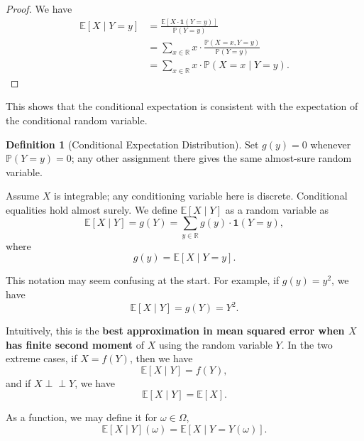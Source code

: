\documentclass[11pt]{article}
\numberwithin{equation}{section}
\theoremstyle{definition}
\newtheorem{definition}[theorem]{Definition}
\theoremstyle{remark}
\newcommand{\pqty}[1]{\left(#1\right)}
\newcommand{\bqty}[1]{\left[#1\right]}
\newcommand{\RR}{\mathbb R}
\newcommand{\indicator}{\mathbf 1}
\newcommand{\Prob}{\mathbb P}
\newcommand{\Expt}{\mathbb E}
\newcommand{\indp}{\mathrel{\perp\!\!\!\perp}}
\newcommand{\Conditional}[2]{#1\mid #2}
\begin{document}
\begin{proof}\label{probability-proof-034}
    We have
    \begin{align*}
        \Expt\bqty{\Conditional{X}{Y = y}} &= \frac{\Expt\bqty{X \cdot \indicator\pqty{Y = y}}}{\Prob\pqty{Y = y}} \\
        &= \sum_{x \in \RR} x \cdot \frac{\Prob\pqty{X = x, Y = y}}{\Prob\pqty{Y = y}} \\
        &= \sum_{x \in \RR} x \cdot \Prob\pqty{\Conditional{X = x}{Y = y}}.
    \end{align*}
\end{proof}

This shows that the conditional expectation is consistent with the expectation of the conditional random variable.

\begin{definition}[Conditional Expectation Distribution]\label{probability-definition-035}
    \label{probability-def:conditional-expectation-distribution}
Set \(g(y)=0\) whenever \(\Prob(Y=y)=0\); any other assignment there gives the same almost-sure random variable.

Assume \(X\) is integrable; any conditioning variable here is discrete. Conditional equalities hold almost surely.
%
    We define \(\Expt\bqty{\Conditional{X}{Y}}\) as a random variable as
    \[
        \Expt\bqty{\Conditional{X}{Y}} = g\pqty{Y} = \sum_{y \in \RR} g\pqty{y} \cdot \indicator\pqty{Y = y},
    \]
    where
    \[
        g\pqty{y} = \Expt\bqty{\Conditional{X}{Y = y}}.
    \]
\end{definition}

This notation may seem confusing at the start. For example, if \(g\pqty{y} = y^2\), we have
\[
    \Expt\bqty{\Conditional{X}{Y}} = g\pqty{Y} = Y^2.
\]

Intuitively, this is the \textbf{best approximation in mean squared error when \(X\) has finite second moment} of \(X\) using the random variable \(Y\). In the two extreme cases, if \(X = f\pqty{Y}\), then we have
\[
    \Expt\bqty{\Conditional{X}{Y}} = f\pqty{Y},
\]
and if \(X \indp Y\), we have
\[
    \Expt\bqty{\Conditional{X}{Y}} = \Expt\bqty{X}.
\]

As a function, we may define it for \(\omega \in \Omega\),
\[
    \Expt\bqty{\Conditional{X}{Y}}\pqty{\omega} = \Expt\bqty{\Conditional{X}{Y = Y\pqty{\omega}}}.
\]
\end{document}
